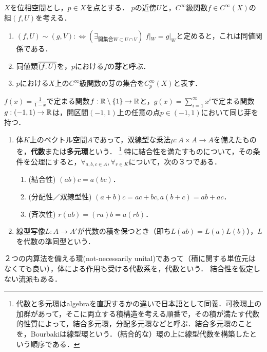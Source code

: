 \documentclass[uplatex,dvipdfmx]{jsreport}
\begin{document}
\begin{definition}[germ]
    $X$を位相空間とし，$p\in X$を点とする．
    $p$の近傍$U$と，$C^\infty$級関数$f\in C^\infty(X)$の組$(f,U)$を考える．
    \begin{enumerate}
        \item $(f,U)\sim(g,V):\Leftrightarrow (\exists_{開集合W\subset U\cap V})\;f|_W=g|_W$と定めると，これは同値関係である．
        \item 同値類$\overline{(f,U)}$を，$p$における$f$の\textbf{芽}と呼ぶ．
        \item $p$における$X$上の$C^\infty$級関数の芽の集合を$C^\infty_p(X)$と表す．
    \end{enumerate}
\end{definition}

\begin{example}
    $f(x)=\frac{1}{1-x}$で定まる関数$f:\mathbb{R}\setminus\{1\}\to\mathbb{R}$と，$g(x)=\sum^\infty_{i=1}x^i$で定まる関数$g:(-1,1)\to\mathbb{R}$は，開区間$(-1,1)$上の任意の点$p\in(-1,1)$において同じ芽を持つ．
\end{example}

\begin{definition}\mbox{}\label{del-linear-ring}
    \begin{enumerate}
        \item 
    体$K$上のベクトル空間$A$であって，双線型な乗法$\mu:A\times A\to A$を備えたものを，\textbf{代数}または\textbf{多元環}という．
    \footnote{代数と多元環はalgebraを直訳するかの違いで日本語として同義．可換環上の加群があって，そこに両立する積構造を考える順番で，その積が満たす代数的性質によって，結合多元環，分配多元環などと呼ぶ．結合多元環のことを，Bourbakiは線型環という．（結合的な）環の上に線型代数を構築したという順序である．}
    特に結合性を満たすものについて，その条件を公理にすると，$\forall_{a,b,c\in A},\forall_{r\in K}$について，次の３つである．
    \begin{enumerate}
        \item (結合性) $(ab)c=a(bc)$．
        \item (分配性／双線型性) $(a+b)c=ac+bc,a(b+c)=ab+ac$．
        \item (斉次性) $r(ab)=(ra)b=a(rb)$．
    \end{enumerate}
        \item 線型写像$L:A\to A'$が代数の積を保つとき（即ち$L(ab)=L(a)L(b)$），$L$を代数の準同型という．
    \end{enumerate}
\end{definition}
\begin{remarks}
    ２つの内算法を備える環(not-necessarily unital)であって（積に関する単位元はなくても良い），体による作用も受ける代数系を，代数という．
    結合性を仮定しない流派もある．
\end{remarks}
\end{document}
